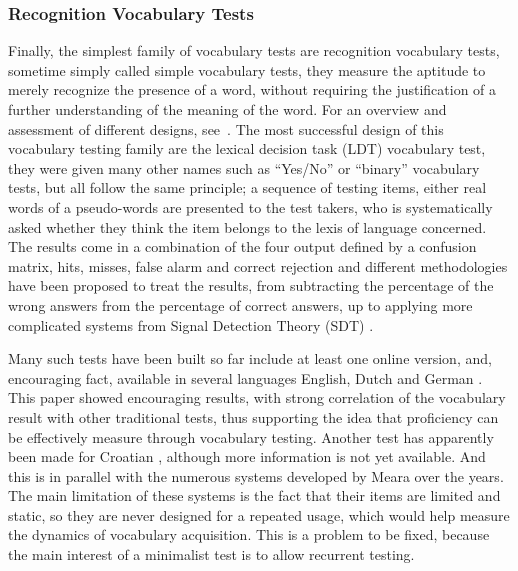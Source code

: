         \subsubsection{Recognition Vocabulary Tests}
Finally, the simplest family of vocabulary tests are recognition vocabulary tests, sometime simply called simple vocabulary tests, they measure the aptitude to merely recognize the presence of a word, without requiring the justification of a further understanding of the meaning of the word. For an overview and assessment of different designs, see~\cite{meara_complexities_1994}. The most successful design of this vocabulary testing family are the lexical decision task (LDT) vocabulary test, they were given many other names such as ``Yes/No'' or ``binary'' vocabulary tests, but all follow the same principle; a sequence of testing items, either real words of a pseudo-words \parencite{meara_imaginary_2012} are presented to the test takers, who is systematically asked whether they think the item belongs to the lexis of language concerned. The results come in a combination of the four output defined by a confusion matrix, hits, misses, false alarm and correct rejection and different methodologies have been proposed to treat the results, from subtracting the percentage of the wrong answers from the percentage of correct answers, up to applying more complicated systems from Signal Detection Theory (SDT) \parencite{huibregtse_scores_2002}.

Many such tests have been built so far include at least one online version, and, encouraging fact, available in several languages English, Dutch and German \parencite{lemhofer_introducing_2012}. This paper showed encouraging results, with strong correlation of the vocabulary result with other traditional tests, thus supporting the idea that proficiency can be effectively measure through vocabulary testing. Another test has apparently been made for Croatian \parencite{srce_how_2025}, although more information is not yet available. And this is in parallel with the numerous systems developed by Meara over the years\cite{meara_complexities_1994}. The main limitation of these systems is the fact that their items are limited and static, so they are never designed for a repeated usage, which would help measure the dynamics of vocabulary acquisition. This is a problem to be fixed, because the main interest of a minimalist test is to allow recurrent testing.


